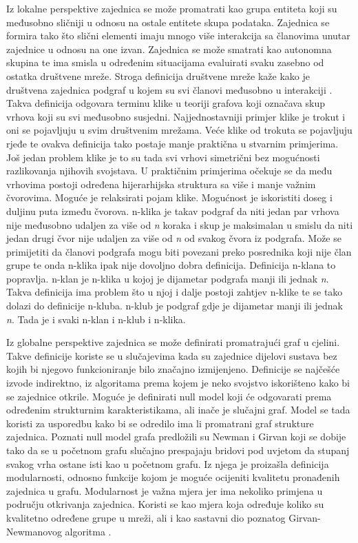 Iz lokalne perspektive zajednica se može promatrati kao grupa entiteta koji su međusobno sličniji u odnosu na ostale entitete skupa podataka. Zajednica se formira tako što slični elementi imaju mnogo više interakcija sa članovima unutar zajednice u odnosu na one izvan. Zajednica se može smatrati kao autonomna skupina te ima smisla u određenim situacijama evaluirati svaku zasebno od ostatka društvene mreže. Stroga definicija društvene mreže kaže kako je društvena zajednica podgraf u kojem su svi članovi međusobno u interakciji \cite{luce1949method}. Takva definicija odgovara terminu klike u teoriji grafova koji označava skup vrhova koji su svi međusobno susjedni. Najjednostavniji primjer klike je trokut i oni se pojavljuju u svim društvenim mrežama. Veće klike od trokuta se pojavljuju rjeđe te ovakva definicija tako postaje manje praktična u stvarnim primjerima. Još jedan problem klike je to su tada svi vrhovi simetrični bez mogućnosti razlikovanja njihovih svojstava. U praktičnim primjerima očekuje se da među vrhovima postoji određena hijerarhijska struktura sa više i manje važnim čvorovima. Moguće je relaksirati pojam klike. Mogućnost je iskoristiti doseg i duljinu puta između čvorova. n-klika je takav podgraf da niti jedan par vrhova nije međusobno udaljen za više od \textit{n} koraka i skup je maksimalan u smislu da niti jedan drugi čvor nije udaljen za više od \textit{n} od svakog čvora iz podgrafa. Može se primijetiti da članovi podgrafa mogu biti povezani preko posrednika koji nije član grupe te onda n-klika ipak nije dovoljno dobra definicija. Definicija n-klana to popravlja. n-klan je n-klika u kojoj je dijametar podgrafa manji ili jednak \textit{n}. Takva definicija ima problem što u njoj i dalje postoji zahtjev n-klike te se tako dolazi do definicije n-kluba. n-klub je podgraf gdje je dijametar manji ili jednak \textit{n}. Tada je i svaki n-klan i n-klub i n-klika.

Iz globalne perspektive zajednica se može definirati promatrajući graf u cjelini. Takve definicije koriste se u slučajevima kada su zajednice dijelovi sustava bez kojih bi njegovo funkcioniranje bilo značajno izmijenjeno. Definicije se najčešće izvode indirektno, iz algoritama prema kojem je neko svojstvo iskorišteno kako bi se zajednice otkrile. Moguće je definirati null model koji će odgovarati prema određenim strukturnim karakteristikama, ali inače je slučajni graf. Model se tada koristi za usporedbu kako bi se odredilo ima li promatrani graf strukture zajednica. Poznati null model grafa predložili su Newman i Girvan koji se dobije tako da se u početnom grafu slučajno prespajaju bridovi pod uvjetom da stupanj svakog vrha ostane isti kao u početnom grafu. Iz njega je proizašla definicija modularnosti, odnosno funkcije kojom je moguće ocijeniti kvalitetu pronađenih zajednica u grafu. Modularnost je važna mjera jer ima nekoliko primjena u području otkrivanja zajednica. Koristi se kao mjera koja određuje koliko su kvalitetno određene grupe u mreži, ali i kao sastavni dio poznatog Girvan-Newmanovog algoritma \cite{fortunato2010community}.

